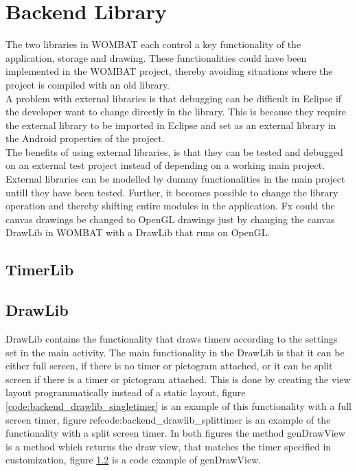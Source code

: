 \section{Backend Library}
\label{sec:backend}
The two libraries in WOMBAT each control a key functionality of the application, storage and drawing.
These functionalities could have been implemented in the WOMBAT project, thereby avoiding situations where the project is compiled with an old library.\\
A problem with external libraries is that debugging can be difficult in Eclipse if the developer want to change directly in the library. This is because they require the external library to be imported in Eclipse and set as an external library in the Android properties of the project.\\
The benefits of using external libraries, is that they can be tested and debugged on an external test project instead of depending on a working main project.
External libraries can be modelled by dummy functionalities in the main project untill they have been tested.
Further, it becomes possible to change the library operation and thereby shifting entire modules in the application.
Fx could the canvas drawings be changed to OpenGL drawings just by changing the canvas DrawLib in WOMBAT with a DrawLib that runs on OpenGL.


\subsection{TimerLib}

\subsection{DrawLib}
DrawLib contains the functionality that draws timers according to the settings set in the main activity.
The main functionality in the DrawLib is that it can be either full screen, if there is no timer or pictogram attached, or it can be split screen if there is a timer or pictogram attached.
This is done by creating the view layout programmatically instead of a static layout, figure \ref{code:backend_drawlib_singletimer} is an example of this functionality with a full screen timer, figure ref{code:backend_drawlib_splittimer} is an example of the functionality with a split screen timer.
In both figures the method genDrawView is a method which returns the draw view, that matches the timer specified in customization, figure \ref{} is a code example of genDrawView.


